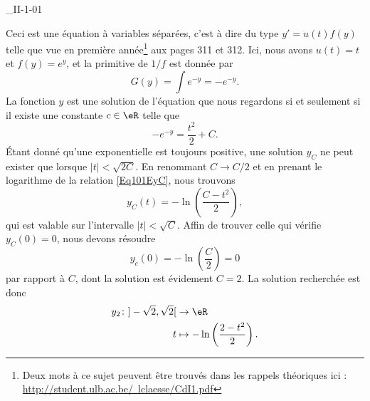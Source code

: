 

\begin{corrige}{_II-1-01}

Ceci est une équation à variables séparées, c'est à dire du type $y'=u(t)f(y)$ telle que vue en première année\footnote{Deux mots à ce sujet peuvent être trouvés dans les rappels théoriques ici :\\\href{http://student.ulb.ac.be/~lclaesse/CdI1.pdf}{http://student.ulb.ac.be/~lclaesse/CdI1.pdf}} aux pages 311 et 312. Ici, nous avons $u(t)=t$ et $f(y)= e^{y}$, et la primitive de $1/f$ est donnée par
\begin{equation}
	G(y)=\int e^{-y}=- e^{-y}.
\end{equation}
La fonction $y$ est une solution de l'équation que nous regardons si et seulement si il existe une constante $c\in\eR$ telle que
\begin{equation}		\label{Eq101EyC}
	- e^{-y}=\frac{ t^2 }{ 2 }+C.
\end{equation}
Étant donné qu'une exponentielle est toujours positive, une solution $y_C$ ne peut exister que lorsque $| t |<\sqrt{2C}$. En renommant $C\to C/2$ et en prenant le logarithme de la relation \eqref{Eq101EyC}, nous trouvons
\begin{equation}
	y_C(t)=-\ln\left( \frac{ C-t^2 }{ 2 } \right),
\end{equation}
qui est valable sur l'intervalle $| t |<\sqrt{C}$. Affin de trouver celle qui vérifie $y_C(0)=0$, nous devons résoudre
\begin{equation}
	y_c(0)=-\ln\left( \frac{ C }{ 2 } \right)=0
\end{equation}
par rapport à $C$, dont la solution est évidement $C=2$. La solution recherchée est donc
\begin{equation}
	\begin{aligned}
		y_2\colon ]-\sqrt{2},\sqrt{2}[&\to \eR \\
		t&\mapsto -\ln\left( \frac{ 2-t^2 }{2} \right).
	\end{aligned}
\end{equation}


\end{corrige}
